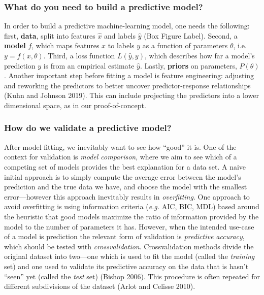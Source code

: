 \documentclass[10pt,oneside]{article}
\begin{document}
\hypertarget{what-do-you-need-to-build-a-predictive-model}{%
\subsubsection{What do you need to build a predictive
model?}\label{what-do-you-need-to-build-a-predictive-model}}

In order to build a predictive machine-learning model, one needs the
following: first, \textbf{data}, split into features \(\hat{x}\) and
labels \(\hat{y}\) (Box Figure Label). Second, a \textbf{model} \(f\),
which maps features \(x\) to labels \(y\) as a function of parameters
\(\theta\), i.e.~\(y = f(x, \theta)\). Third, a loss function
\(L(\hat{y}, y)\), which describes how far a model's prediction \(y\) is
from an empirical estimate \(\hat{y}\). Lastly, \textbf{priors} on
parameters, \(P(\theta)\). Another important step before fitting a model
is feature engineering: adjusting and reworking the predictors to better
uncover predictor-response relationships (Kuhn and Johnson 2019). This
can include projecting the predictors into a lower dimensional space, as
in our proof-of-concept.

\hypertarget{how-do-we-validate-a-predictive-model}{%
\subsubsection{How do we validate a predictive
model?}\label{how-do-we-validate-a-predictive-model}}

After model fitting, we inevitably want to see how ``good'' it is. One
of the context for validation is \emph{model comparison}, where we aim
to see which of a competing set of models provides the best explanation
for a data set. A naive initial approach is to simply compute the
average error between the model's prediction and the true data we have,
and choose the model with the smallest error---however this approach
inevitably results in \emph{overfitting}. One approach to avoid
overfitting is using information criteria (\emph{e.g.} AIC, BIC, MDL)
based around the heuristic that good models maximize the ratio of
information provided by the model to the number of parameters it has.
However, when the intended use-case of a model is prediction the
relevant form of validation is \emph{predictive accuracy}, which should
be tested with \emph{crossvalidation}. Crossvalidation methods divide
the original dataset into two---one which is used to fit the model
(called the \emph{training} set) and one used to validate its predictive
accuracy on the data that is hasn't ``seen'' yet (called the \emph{test}
set) (Bishop 2006). This procedure is often repeated for different
subdivisions of the dataset (Arlot and Celisse 2010).
\end{document}
